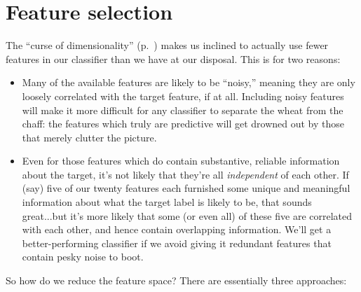 
\chapter{Feature selection}


The ``curse of dimensionality'' (p.~\pageref{sec:curse}) makes us inclined to
actually use fewer features in our classifier than we have at our disposal.
This is for two reasons:

\begin{itemize}
\itemsep.1em
\item Many of the available features are likely to be ``noisy,'' meaning they
are only loosely correlated with the target feature, if at all. Including
noisy features will make it more difficult for any classifier to separate the
wheat from the chaff: the features which truly are predictive will get drowned
out by those that merely clutter the picture.

\item Even for those features which do contain substantive, reliable
information about the target, it's not likely that they're all
\textit{independent} of each other. If (say) five of our twenty features each
furnished some unique and meaningful information about what the target label
is likely to be, that sounds great...but it's more likely that some (or even
all) of these five are correlated with each other, and hence contain
overlapping information. We'll get a better-performing classifier if we
avoid giving it redundant features that contain pesky noise to boot.

\end{itemize}

So how do we reduce the feature space? There are essentially three approaches:

